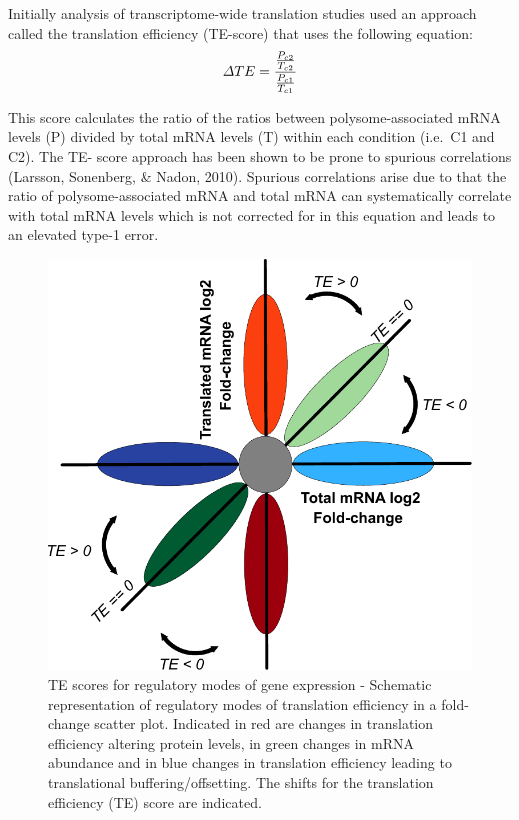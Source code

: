 \documentclass[
  12pt,
  openany]{book}
\begin{document}
Initially analysis of transcriptome-wide translation studies used an approach called the translation efficiency (TE-score) that uses the following equation:
\[\varDelta TE = \frac{\frac{P_{c2}}{T_{c2}}} {\frac{P_{c1}}{T_{c1}}}\\\]

This score calculates the ratio of the ratios between polysome-associated mRNA levels (P) divided by total mRNA levels (T) within each condition (i.e.~C1 and C2). The TE- score approach has been shown to be prone to spurious correlations (Larsson, Sonenberg, \& Nadon, 2010). Spurious correlations arise due to that the ratio of polysome-associated mRNA and total mRNA can systematically correlate with total mRNA levels which is not corrected for in this equation and leads to an elevated type-1 error.
\clearpage

\begin{figure}
  \includegraphics{./figures/geneModes_TE.pdf}
  \caption{TE scores for regulatory modes of gene expression -  Schematic representation of regulatory modes of translation efficiency in a fold-change scatter plot. Indicated in red are changes in translation efficiency altering protein levels, in green changes in mRNA abundance and in blue changes in translation efficiency leading to translational buffering/offsetting. The shifts for the translation efficiency (TE) score are indicated. \label{fig:TE}}
\end{figure}
\end{document}
